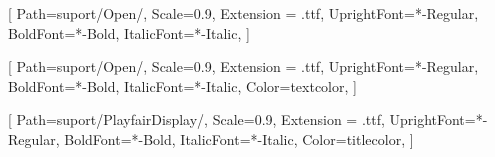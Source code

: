 \usepackage{geometry}
\usepackage{xcolor}
\usepackage{eso-pic}
\usepackage{fancyhdr}
\usepackage{sectsty}
\usepackage{fontspec}
\usepackage{titlesec}
\usepackage{graphicx}
\usepackage{ragged2e}
\usepackage{tikz}
\usepackage{wallpaper}
\usepackage{pdflscape} %



\setsansfont{OpenSans}[
  Path=suport/Open/,
  Scale=0.9,
  Extension = .ttf,
  UprightFont=*-Regular,
  BoldFont=*-Bold,
  ItalicFont=*-Italic,
]

\setmainfont{OpenSans}[
  Path=suport/Open/,
  Scale=0.9,
  Extension = .ttf,
  UprightFont=*-Regular,
  BoldFont=*-Bold,
  ItalicFont=*-Italic,
  Color=textcolor,
]

\newfontfamily{}[
  Path=suport/PlayfairDisplay/,
  Scale=0.9,
  Extension = .ttf,
  UprightFont=*-Regular,
  BoldFont=*-Bold,
  ItalicFont=*-Italic,
  Color=titlecolor,
]

\chapterfont{\color{dark}\fontsize{16}{16.8}\playfair} %
\sectionfont{\color{dark}\fontsize{14}{14.8}\playfair} %
\subsectionfont{\color{dark}\fontsize{12}{12.8}\playfair} %
\subsubsectionfont{\color{dark}\fontsize{11}{11.8}\playfair} %

\setcounter{secnumdepth}{3}


